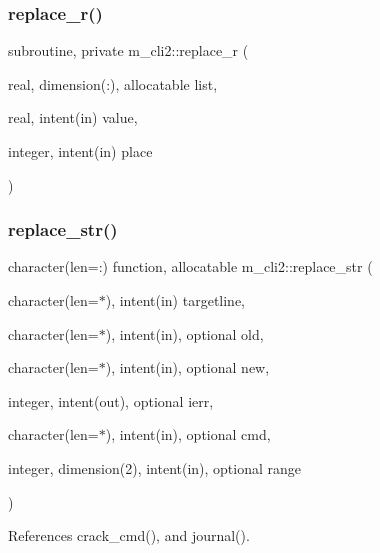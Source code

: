 \mbox{\label{namespacem__cli2_abe681a8b55ae238b029766713a79210a}} 
\subsubsection{\texorpdfstring{replace\+\_\+r()}{replace\_r()}}
{\footnotesize\ttfamily subroutine, private m\+\_\+cli2\+::replace\+\_\+r (\begin{DoxyParamCaption}\item[{real, dimension(\+:), allocatable}]{list,  }\item[{real, intent(in)}]{value,  }\item[{integer, intent(in)}]{place }\end{DoxyParamCaption})\hspace{0.3cm}{\ttfamily [private]}}

\mbox{\label{namespacem__cli2_a8f65cf1b227d837d89437368c660666f}} 
\subsubsection{\texorpdfstring{replace\+\_\+str()}{replace\_str()}}
{\footnotesize\ttfamily character(len=\+:) function, allocatable m\+\_\+cli2\+::replace\+\_\+str (\begin{DoxyParamCaption}\item[{character(len=$\ast$), intent(in)}]{targetline,  }\item[{character(len=$\ast$), intent(in), optional}]{old,  }\item[{character(len=$\ast$), intent(in), optional}]{new,  }\item[{integer, intent(out), optional}]{ierr,  }\item[{character(len=$\ast$), intent(in), optional}]{cmd,  }\item[{integer, dimension(2), intent(in), optional}]{range }\end{DoxyParamCaption})\hspace{0.3cm}{\ttfamily [private]}}



References crack\+\_\+cmd(), and journal().

